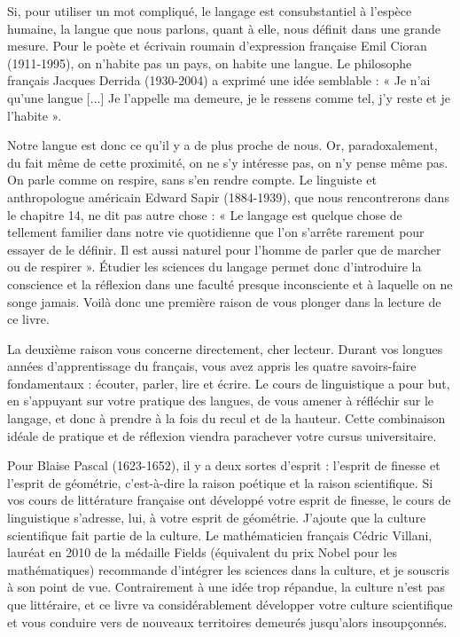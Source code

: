 Si, pour utiliser un mot compliqué, le langage est consubstantiel à l’espèce humaine, la langue que nous parlons, quant à elle, nous définit dans une grande mesure. Pour le poète et écrivain roumain d’expression française Emil Cioran (1911-1995), on n’habite pas un pays, on habite une langue. Le philosophe français Jacques Derrida (1930-2004) a exprimé une idée semblable : « Je n’ai qu’une langue [...] Je l’appelle ma demeure, je le ressens comme tel, j’y reste et je l’habite ».

Notre langue est donc ce qu’il y a de plus proche de nous. Or, paradoxalement, du fait même de cette proximité, on ne s’y intéresse pas, on n’y pense même pas. On parle comme on respire, sans s’en rendre compte. Le linguiste et anthropologue américain Edward Sapir (1884-1939), que nous rencontrerons dans le chapitre 14, ne dit pas autre chose : « Le langage est quelque chose de tellement familier dans notre vie quotidienne que l’on s’arrête rarement pour essayer de le définir. Il est aussi naturel pour l’homme de parler que de marcher ou de respirer ». Étudier les sciences du langage permet donc d’introduire la conscience et la réflexion dans une faculté presque inconsciente et à laquelle on ne songe jamais. Voilà donc une première raison de vous plonger dans la lecture de ce livre.

La deuxième raison vous concerne directement, cher lecteur. Durant vos longues années d’apprentissage du français, vous avez appris les quatre savoirs-faire fondamentaux : écouter, parler, lire et écrire. Le cours de linguistique a pour but, en s’appuyant sur votre pratique des langues, de vous amener à réfléchir sur le langage, et donc à prendre à la fois du recul et de la hauteur. Cette combinaison idéale de pratique et de réflexion viendra parachever votre cursus universitaire.

Pour Blaise Pascal (1623-1652), il y a deux sortes d’esprit : l’esprit de finesse et l’esprit de géométrie, c’est-à-dire la raison poétique et la raison scientifique. Si vos cours de littérature française ont développé votre esprit de finesse, le cours de linguistique s’adresse, lui, à votre esprit de géométrie. J’ajoute que la culture scientifique fait partie de la culture. Le mathématicien français Cédric Villani, lauréat en 2010 de la médaille Fields (équivalent du prix Nobel pour les mathématiques) recommande d’intégrer les sciences dans la culture, et je souscris à son point de vue. Contrairement à une idée trop répandue, la culture n’est pas que littéraire, et ce livre va considérablement développer votre culture scientifique et vous conduire vers de nouveaux territoires demeurés jusqu’alors insoupçonnés.

